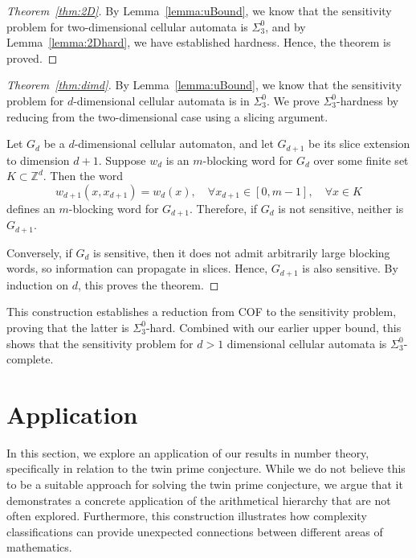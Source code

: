 \documentclass{llncs}
\begin{document}
\begin{proof}[Theorem~\ref{thm:2D}]
By Lemma~\ref{lemma:uBound}, we know that the sensitivity problem for two-dimensional cellular automata is $\Sigma^0_3$, and by Lemma~\ref{lemma:2Dhard}, we have established hardness. Hence, the theorem is proved.
\end{proof}

\begin{proof}[Theorem~\ref{thm:dimd}]
By Lemma~\ref{lemma:uBound}, we know that the sensitivity problem for $d$-dimensional cellular automata is in $\Sigma^0_3$. We prove $\Sigma^0_3$-hardness by reducing from the two-dimensional case using a slicing argument.

Let $G_d$ be a $d$-dimensional cellular automaton, and let $G_{d+1}$ be its slice extension to dimension $d+1$. Suppose $w_d$ is an $m$-blocking word for $G_d$ over some finite set $K \subset \mathbb{Z}^d$. Then the word
\begin{equation}
w_{d+1}(x, x_{d+1}) = w_d(x), \quad \forall x_{d+1} \in [0, m-1], \quad \forall x \in K
\end{equation}
defines an $m$-blocking word for $G_{d+1}$. Therefore, if $G_d$ is not sensitive, neither is $G_{d+1}$.

Conversely, if $G_d$ is sensitive, then it does not admit arbitrarily large blocking words, so information can propagate in slices. Hence, $G_{d+1}$ is also sensitive. By induction on $d$, this proves the theorem.

\end{proof}

This construction establishes a reduction from COF to the sensitivity problem, proving that the latter is $\Sigma^0_3$-hard. Combined with our earlier upper bound, this shows that the sensitivity problem for $d>1$ dimensional cellular automata is $\Sigma^0_3$-complete.



\section{Application}\label{sec:twin}

In this section, we explore an application of our results in number theory, specifically in relation to the twin prime conjecture. While we do not believe this to be a suitable approach for solving the twin prime conjecture, we argue that it demonstrates a concrete application of the arithmetical hierarchy that are not often explored. Furthermore, this construction illustrates how complexity classifications can provide unexpected connections between different areas of mathematics.
\end{document}
